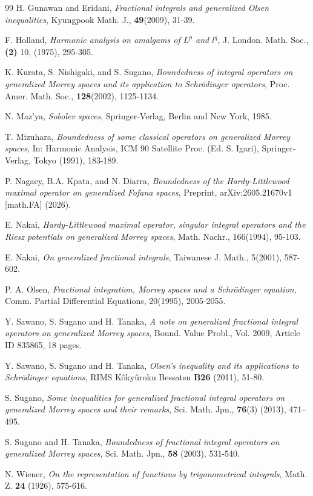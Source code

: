 \documentclass[a4paper,12pt,intlimits,oneside]{amsart}
\numberwithin{equation}{section}
\numberwithin{equation}{section}
\theoremstyle{definition}
\begin{document}
\begin{thebibliography}{99}
 H. Gunawan and Eridani, \textit{Fractional integrals and generalized Olsen inequalities}, Kyungpook Math. J.,
      \textbf{49}(2009), 31-39.

  F. Holland, \textit{Harmonic analysis on amalgams of $L^{p}$ and $l^{q}$}, J. London. Math. Soc., \textbf{(2)} 10, (1975), 295-305.


 K. Kurata, S. Nishigaki, and S. Sugano, \textit{Boundedness of integral operators on generalized
Morrey spaces and its application to Schr\"odinger operators}, Proc. Amer. Math.
Soc.,\textbf{ 128}(2002), 1125-1134.

 N. Maz'ya, \textit{Sobolev spaces}, Springer-Verlag, Berlin and New York, 1985.

 T. Mizuhara, \textit{Boundedness of some classical operators on generalized Morrey spaces}, In: Harmonic Analysis, ICM 90 Satellite Proc. (Ed. S. Igari), Springer-Verlag, Tokyo (1991), 183-189.

 P. Nagacy, B.A. Kpata, and N. Diarra, \textit{Boundedness of the Hardy-Littlewood maximal operator on
generalized Fofana spaces}, Preprint, arXiv:2605.21670v1 [math.FA] (2026). 


E. Nakai, \textit{Hardy-Littlewood maximal operator, singular integral operators and the Riesz potentials on generalized Morrey spaces}, Math. Nachr., 166(1994), 95-103. 

E. Nakai, \textit{On generalized fractional integrals}, Taiwanese J. Math., 5(2001), 587-602.
             
 P. A. Olsen, \textit{Fractional integration, Morrey spaces and a Schr\"odinger equation}, Comm. Partial Differential Equations, 20(1995), 2005-2055.

 Y. Sawano, S. Sugano and H. Tanaka, \textit{A note on generalized fractional integral operators on generalized Morrey spaces}, 	Bound. Value Probl., Vol. 2009, Article ID 835865, 18 pages.


 Y. Sawano, S. Sugano and H. Tanaka, \textit{Olsen's inequality and its applications to Schr\"odinger equations}, RIMS Kôkyûroku Bessatsu \textbf{B26} (2011), 51-80.

 S. Sugano, \textit{Some inequalities for generalized fractional integral operators on generalized Morrey spaces and their remarks}, Sci. Math. Jpn., \textbf{76}(3) (2013), 471–495.


 S. Sugano and H. Tanaka, \textit{Boundedness of fractional integral operators on generalized
Morrey spaces}, Sci. Math. Jpn., \textbf{58} (2003), 531-540.

 N. Wiener, \textit{On the representation of functions by trigonometrical integrals},  Math. Z. \textbf{24} (1926), 575-616.
\end{thebibliography}
\end{document}
